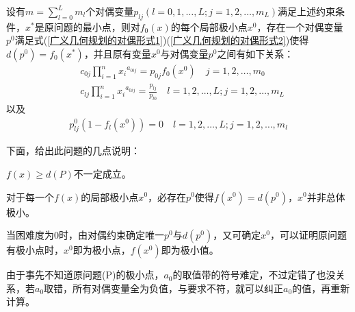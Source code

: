         \begin{theorem}
        设有$m=\mathop{\sum}\limits_{l=0}^{L}m_l$个对偶变量$p_{lj}(l=0,1,\ldots,L;j=1,2,\ldots,m_L)$满足上述约束条件，$x^*$是原问题的最小点，则对$f_0(x)$的每个局部极小点$x^0$，存在一个对偶变量$p^0$满足式(\ref{广义几何规划的对偶形式1})(\ref{广义几何规划的对偶形式2})使得$d(p^0)=f_0(x^*)$，并且原有变量$x^0$与对偶变量$p^0$之间有如下关系：
        \begin{align*}
        &c_{0j}\mathop{\prod}\limits_{i=1}^{n}{x_i}^{a_{0ij}}=p_{0j}f_{0}(x^0)\quad j=1,2,\ldots,m_0\\
        &c_{lj}\mathop{\prod}\limits_{i=1}^{n}{x_i}^{a_{0ij}}=\frac{p_{lj}}{p_{l0}} \quad l=1,2,\ldots,L;j=1,2,\ldots,m_L
        \end{align*}
        以及
        \begin{align*}
        p_{lj}^0(1-f_l(x^0))=0 \quad l=1,2,\ldots,L;j=1,2,\ldots,m_l
        \end{align*}
        \end{theorem}
        \par
        下面，给出此问题的几点说明：\par
        $f(x)\geqslant d(P)$不一定成立。\par
        对于每一个$f(x)$的局部极小点$x^0$，必存在$p^0$使得$f(x^0)=d(p^0)$，$x^0$并非总体极小。
        \par
        当困难度为0时，由对偶约束确定唯一$p^0$与$d(p^0)$，又可确定$x^0$，可以证明原问题有极小点时，$x^0$即为极小点，$f(x^0)$即为极小值。
        \par
        由于事先不知道原问题(P)的极小点，$a_0$的取值带的符号难定，不过定错了也没关系，若$a_0$取错，所有对偶变量全为负值，与要求不符，就可以纠正$a_0$的值，再重新计算。
